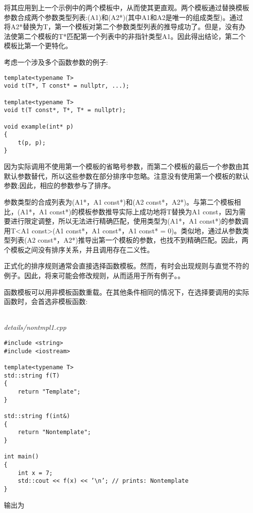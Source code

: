 将其应用到上一个示例中的两个模板中，从而使其更直观。两个模板通过替换模板参数合成两个参数类型列表:(A1)和(A2*)(其中A1和A2是唯一的组成类型)。通过将A2*替换为T，第一个模板对第二个参数类型列表的推导成功了。但是，没有办法使第二个模板的T*匹配第一个列表中的非指针类型A1。因此得出结论，第二个模板比第一个更特化。

考虑一个涉及多个函数参数的例子:

\begin{lstlisting}[style=styleCXX]
template<typename T>
void t(T*, T const* = nullptr, ...);

template<typename T>
void t(T const*, T*, T* = nullptr);

void example(int* p)
{
	t(p, p);
}
\end{lstlisting}

因为实际调用不使用第一个模板的省略号参数，而第二个模板的最后一个参数由其默认参数替代，所以这些参数在部分排序中忽略。注意没有使用第一个模板的默认参数;因此，相应的参数参与了排序。

参数类型的合成列表为(A1*，A1 const*)和(A2 const*，A2*)。与第二个模板相比，(A1*，A1 const*)的模板参数推导实际上成功地将T替换为A1 const，因为需要进行限定调整，所以无法进行精确匹配，使用类型为(A1*，A1 const*)的参数调用T<A1 const>(A1 const*，A1 const*，A1 const* = 0)。类似地，通过从参数类型列表(A2 const*，A2*)推导出第一个模板的参数，也找不到精确匹配。因此，两个模板之间没有排序关系，并且调用存在二义性。

正式化的排序规则通常会直接选择函数模板。然而，有时会出现规则与直觉不符的例子。因此，将来可能会修改规则，从而适用于所有例子。。


函数模板可以用非模板函数重载。在其他条件相同的情况下，在选择要调用的实际函数时，会首选非模板函数:

\hspace*{\fill} \\ %
\noindent
\textit{details/nontmpl1.cpp}
\begin{lstlisting}[style=styleCXX]
#include <string>
#include <iostream>

template<typename T>
std::string f(T)
{
	return "Template";
}

std::string f(int&)
{
	return "Nontemplate";
}

int main()
{
	int x = 7;
	std::cout << f(x) << ’\n’; // prints: Nontemplate
}
\end{lstlisting}

输出为

